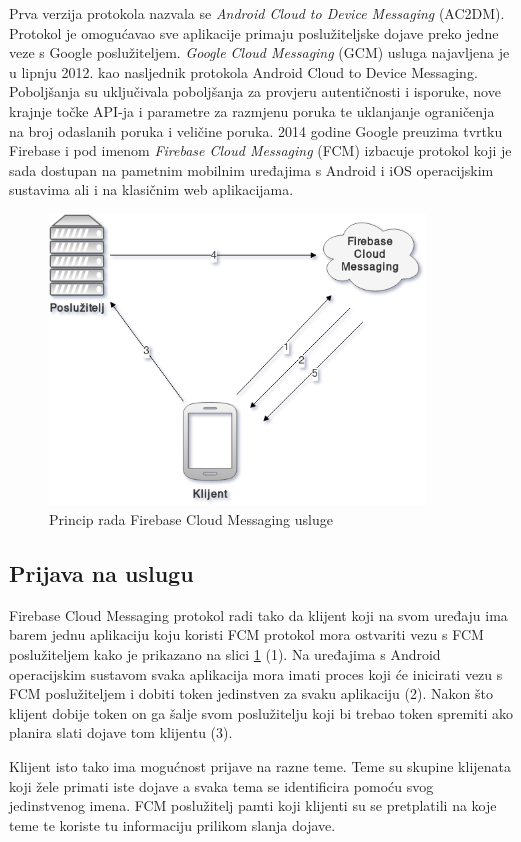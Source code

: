 \documentclass[times, utf8, zavrsni]{fer}
\begin{document}
{Prva verzija protokola nazvala se {\em Android Cloud to Device Messaging} (AC2DM). Protokol je omogućavao sve aplikacije primaju poslužiteljske dojave preko jedne veze s Google poslužiteljem. {\em Google Cloud Messaging} (GCM) usluga najavljena je u lipnju 2012. kao nasljednik protokola Android Cloud to Device Messaging. Poboljšanja su uključivala poboljšanja za provjeru autentičnosti i isporuke, nove krajnje točke API-ja i parametre za razmjenu poruka te uklanjanje ograničenja na broj odaslanih poruka i veličine poruka. 2014 godine Google preuzima tvrtku Firebase i pod imenom {\em Firebase Cloud Messaging} (FCM) izbacuje protokol koji je sada dostupan na pametnim mobilnim uređajima s Android i iOS operacijskim sustavima ali i na klasičnim web aplikacijama.

\begin{figure}[htb]
\centering
\includegraphics[width=10cm]{img/fcm.png}
\caption{Princip rada Firebase Cloud Messaging usluge}
\label{fig:fcm-image}
\end{figure}

\subsection{Prijava na uslugu}
Firebase Cloud Messaging protokol radi tako da klijent koji na svom uređaju ima barem jednu aplikaciju koju koristi FCM protokol mora ostvariti vezu s FCM poslužiteljem kako je prikazano na slici \ref{fig:fcm-image} (1). Na uređajima s Android operacijskim sustavom svaka aplikacija mora imati proces koji će inicirati vezu s FCM poslužiteljem i dobiti token jedinstven za svaku aplikaciju (2). Nakon što klijent dobije token on ga šalje svom poslužitelju koji bi trebao token spremiti ako planira slati dojave tom klijentu (3). 

Klijent isto tako ima mogućnost prijave na razne teme. Teme su skupine klijenata koji žele primati iste dojave a svaka tema se identificira pomoću svog jedinstvenog imena. FCM poslužitelj pamti koji klijenti su se pretplatili na koje teme te koriste tu informaciju prilikom slanja dojave.

}
\end{document}
